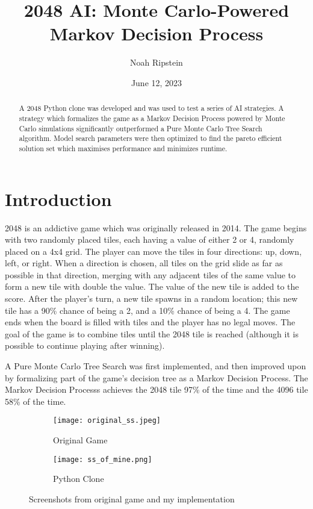 \documentclass{article}
\title{2048 AI: Monte Carlo-Powered Markov Decision Process}
\author{Noah Ripstein}
\date{June 12, 2023}
\begin{document}
\usetikzlibrary{decorations.pathreplacing} %
\maketitle


\begin{abstract}
A 2048 Python clone was developed and was used to test a series of AI strategies.  A strategy which formalizes the game as a Markov Decision Process powered by Monte Carlo simulations significantly outperformed a Pure Monte Carlo Tree Search algorithm.  Model search parameters were then optimized to find the pareto efficient solution set which maximises performance and minimizes runtime.
\end{abstract}

\section{Introduction}

2048 is an addictive game which was originally released in 2014.  The game begins with two randomly placed tiles, each having a value of either 2 or 4, randomly placed on a 4x4 grid. The player can move the tiles in four directions: up, down, left, or right. When a direction is chosen, all tiles on the grid slide as far as possible in that direction, merging with any adjacent tiles of the same value to form a new tile with double the value.  The value of the new tile is added to the score. After the player's turn,  a new tile spawns in a random location; this new tile has a 90\% chance of being a 2, and a 10\% chance of being a 4.   The game ends when the board is filled with tiles and the player has no legal moves.  The goal of the game is to combine tiles until the 2048 tile is reached (although it is possible to continue playing after winning).

A Pure Monte Carlo Tree Search was first implemented, and then improved upon by formalizing part of the game's decision tree as a Markov Decision Process.  The Markov Decision Processs achieves the 2048 tile 97\% of the time and the 4096 tile 58\% of the time. 



\begin{figure}[htbp]
  \centering
  \begin{subfigure}[b]{0.45\textwidth}
    \texttt{[image: original\_ss.jpeg]}
    \caption{Original Game}
    \label{fig:original_ss}
  \end{subfigure}
  \hfill
  \begin{subfigure}[b]{0.45\textwidth}
    \texttt{[image: ss\_of\_mine.png]}
    \caption{Python Clone}
    \label{fig:ss_of_mine}
  \end{subfigure}
  \caption{Screenshots from original game and my implementation}
  \label{fig:screenshots}
\end{figure}
\end{document}
